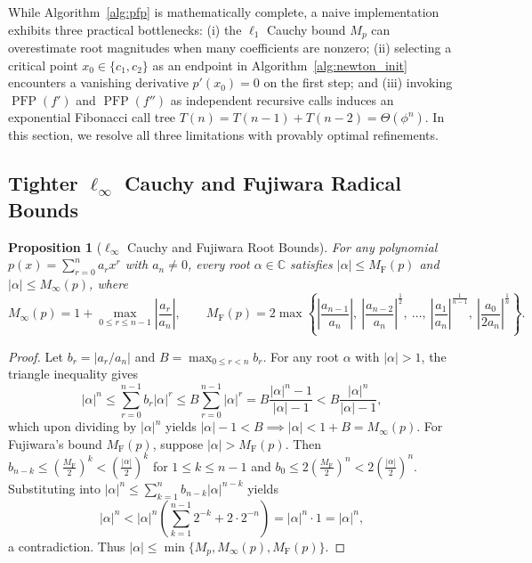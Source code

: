 \documentclass{amsart}
\newtheorem{proposition}{Proposition}
\begin{document}
While Algorithm~\ref{alg:pfp} is mathematically complete, a naive implementation exhibits three practical bottlenecks: (i) the $\ell_1$ Cauchy bound $M_p$ can overestimate root magnitudes when many coefficients are nonzero; (ii) selecting a critical point $x_0 \in \{c_1, c_2\}$ as an endpoint in Algorithm~\ref{alg:newton_init} encounters a vanishing derivative $p'(x_0) = 0$ on the first step; and (iii) invoking $\operatorname{PFP}(f')$ and $\operatorname{PFP}(f'')$ as independent recursive calls induces an exponential Fibonacci call tree $T(n) = T(n-1) + T(n-2) = \Theta(\phi^n)$. In this section, we resolve all three limitations with provably optimal refinements.

\subsection{Tighter $\ell_\infty$ Cauchy and Fujiwara Radical Bounds}

\begin{proposition}[$\ell_\infty$ Cauchy and Fujiwara Root Bounds]\label{prop_fujiwara}
    For any polynomial $p(x) = \sum_{r=0}^n a_r x^r$ with $a_n \neq 0$, every root $\alpha \in \mathbb{C}$ satisfies $|\alpha| \leq M_{\text{F}}(p)$ and $|\alpha| \leq M_\infty(p)$, where
    \[
        M_\infty(p) = 1 + \max_{0 \leq r \leq n-1}\left|\frac{a_r}{a_n}\right|, \qquad
        M_{\text{F}}(p) = 2 \max\left\{\left|\frac{a_{n-1}}{a_n}\right|,\ \left|\frac{a_{n-2}}{a_n}\right|^{\frac{1}{2}},\ \dots,\ \left|\frac{a_1}{a_n}\right|^{\frac{1}{n-1}},\ \left|\frac{a_0}{2a_n}\right|^{\frac{1}{n}}\right\}.
    \]
\end{proposition}
\begin{proof}
    Let $b_r = |a_r / a_n|$ and $B = \max_{0 \leq r < n} b_r$. For any root $\alpha$ with $|\alpha| > 1$, the triangle inequality gives
    \[
        |\alpha|^n \leq \sum_{r=0}^{n-1} b_r |\alpha|^r \leq B \sum_{r=0}^{n-1} |\alpha|^r = B \frac{|\alpha|^n - 1}{|\alpha| - 1} < B \frac{|\alpha|^n}{|\alpha| - 1},
    \]
    which upon dividing by $|\alpha|^n$ yields $|\alpha| - 1 < B \implies |\alpha| < 1 + B = M_\infty(p)$.
    For Fujiwara's bound $M_{\text{F}}(p)$, suppose $|\alpha| > M_{\text{F}}(p)$. Then $b_{n-k} \leq \left(\frac{M_{\text{F}}}{2}\right)^k < \left(\frac{|\alpha|}{2}\right)^k$ for $1 \leq k \leq n-1$ and $b_0 \leq 2\left(\frac{M_{\text{F}}}{2}\right)^n < 2\left(\frac{|\alpha|}{2}\right)^n$. Substituting into $|\alpha|^n \leq \sum_{k=1}^n b_{n-k}|\alpha|^{n-k}$ yields
    \[
        |\alpha|^n < |\alpha|^n \left(\sum_{k=1}^{n-1} 2^{-k} + 2 \cdot 2^{-n}\right) = |\alpha|^n \cdot 1 = |\alpha|^n,
    \]
    a contradiction. Thus $|\alpha| \leq \min\{M_p, M_\infty(p), M_{\text{F}}(p)\}$.
\end{proof}
\end{document}
